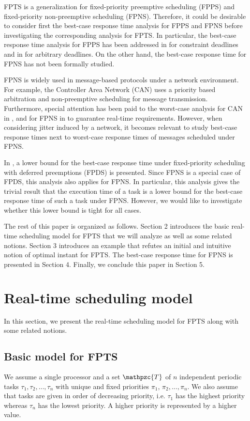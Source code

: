 \documentclass[conference,compsoc]{IEEEtran}
\begin{document}
FPTS is a generalization for fixed-priority preemptive scheduling (FPPS) and fixed-priority non-preemptive scheduling (FPNS). Therefore, it could be desirable to consider first the best-case response time analysis for FPPS and FPNS before investigating the corresponding analysis for FPTS. In particular, the best-case response time analysis for FPPS has been addressed in \cite{RS02} for constraint deadlines and in \cite{BLM13} for arbitrary deadlines. On the other hand, the best-case response time for FPNS has not been formally studied. 

FPNS is widely used in message-based protocols under a network environment. For example, the Controller Area Network (CAN) uses a priority based arbitration and non-preemptive scheduling for message transmission. Furthermore, special attention has been paid to the worst-case analysis for CAN in \cite{DBBL07}, and for FPNS in \cite{BLV09} to guarantee real-time requirements. However, when considering jitter induced by a network, it becomes relevant to study best-case response times next to worst-case response times of messages scheduled under FPNS.

In \cite{BV05}, a lower bound for the best-case response time under fixed-priority scheduling with deferred preemptions (FPDS) is presented. Since FPNS is a special case of FPDS, this analysis also applies for FPNS. In particular, this analysis gives the trivial result that the execution time of a task is a lower bound for the best-case response time of such a task under FPNS. However, we would like to investigate whether this lower bound is tight for all cases.

The rest of this paper is organized as follows. Section 2 introduces the basic real-time scheduling model for FPTS that we will analyze as well as some related notions. Section 3 introduces an example that refutes an initial and intuitive notion of optimal instant for FPTS. The best-case response time for FPNS is presented in Section 4.  Finally, we conclude this paper in Section 5.

\section{Real-time scheduling model}
In this section, we present the real-time scheduling model for FPTS along with some related notions.

\subsection{Basic model for FPTS}
We assume a single processor and a set $\mathpzc{T}$ of $n$ independent periodic tasks $\tau_1,\tau_2,...,\tau_n$ with unique and fixed priorities $\pi_{1}$, $\pi_{2},...,\pi_{n}$. We also assume that tasks are given in order of decreasing priority, i.e. $\tau_1$ has the highest priority whereas $\tau_n$ has the lowest priority. A higher priority is represented by a higher value.
\end{document}
